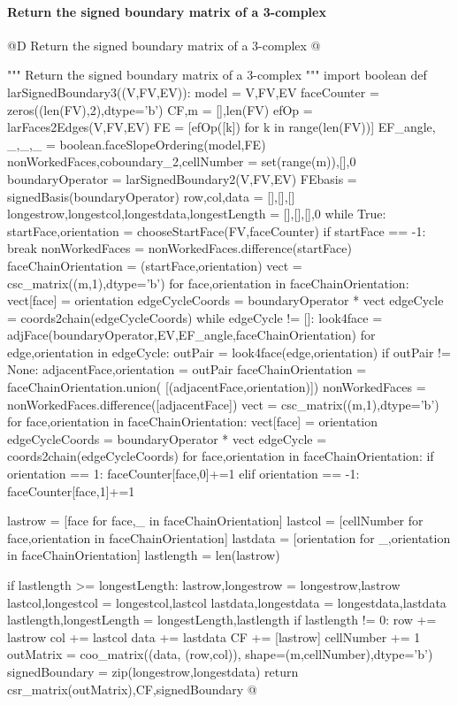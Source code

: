 \documentclass[11pt,oneside]{article}    %
\begin{document}
\paragraph{Return the signed boundary matrix of a 3-complex}
@D Return the signed boundary matrix of a 3-complex
@{""" Return the signed boundary matrix of a 3-complex """
import boolean
def larSignedBoundary3((V,FV,EV)):
    model = V,FV,EV
    faceCounter = zeros((len(FV),2),dtype='b')
    CF,m = [],len(FV)
    efOp = larFaces2Edges(V,FV,EV)
    FE = [efOp([k]) for k in range(len(FV))]
    EF_angle, _,_,_ = boolean.faceSlopeOrdering(model,FE)
    nonWorkedFaces,coboundary_2,cellNumber = set(range(m)),[],0
    boundaryOperator = larSignedBoundary2(V,FV,EV)
    FEbasis = signedBasis(boundaryOperator)
    row,col,data = [],[],[]
    longestrow,longestcol,longestdata,longestLength = [],[],[],0
    while True:
        startFace,orientation = chooseStartFace(FV,faceCounter)
        if startFace == -1: break
        nonWorkedFaces = nonWorkedFaces.difference({startFace})
        faceChainOrientation = {(startFace,orientation)}
        vect = csc_matrix((m,1),dtype='b')
        for face,orientation in faceChainOrientation:  
            vect[face] = orientation
        edgeCycleCoords = boundaryOperator * vect
        edgeCycle = coords2chain(edgeCycleCoords)
        while edgeCycle != []:
            look4face = adjFace(boundaryOperator,EV,EF_angle,faceChainOrientation)
            for edge,orientation in edgeCycle:
                outPair = look4face(edge,orientation)
                if outPair != None:
                    adjacentFace,orientation = outPair
                    faceChainOrientation = faceChainOrientation.union(
                        [(adjacentFace,orientation)])
                    nonWorkedFaces = nonWorkedFaces.difference([adjacentFace])
            vect = csc_matrix((m,1),dtype='b')
            for face,orientation in faceChainOrientation:  
                vect[face] = orientation
            edgeCycleCoords = boundaryOperator * vect
            edgeCycle = coords2chain(edgeCycleCoords)
        for face,orientation in faceChainOrientation:
            if orientation == 1: faceCounter[face,0]+=1
            elif orientation == -1: faceCounter[face,1]+=1
            
        lastrow = [face for face,_ in faceChainOrientation]
        lastcol = [cellNumber for face,orientation in faceChainOrientation]
        lastdata = [orientation for _,orientation in faceChainOrientation]
        lastlength = len(lastrow)
                
        if lastlength >= longestLength:
            lastrow,longestrow = longestrow,lastrow
            lastcol,longestcol = longestcol,lastcol
            lastdata,longestdata = longestdata,lastdata
            lastlength,longestLength = longestLength,lastlength
        if lastlength != 0:
            row += lastrow
            col += lastcol
            data += lastdata
            CF += [lastrow]
            cellNumber += 1            
    outMatrix = coo_matrix((data, (row,col)), shape=(m,cellNumber),dtype='b')
    signedBoundary = zip(longestrow,longestdata)
    return csr_matrix(outMatrix),CF,signedBoundary
@}
\end{document}
